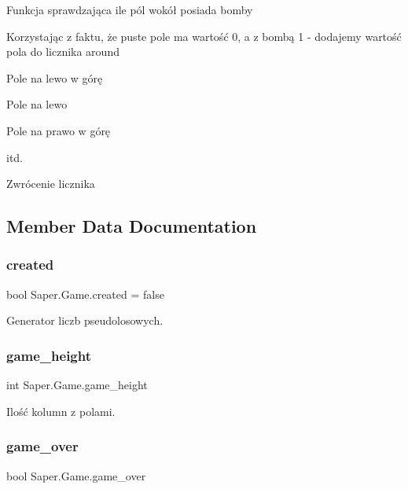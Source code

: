 Funkcja sprawdzająca ile pól wokół posiada bomby

Korzystając z faktu, że puste pole ma wartość 0, a z bombą 1 -\/ dodajemy wartość pola do licznika around

Pole na lewo w górę

Pole na lewo

Pole na prawo w górę

itd.

Zwrócenie licznika 

\subsection{Member Data Documentation}
\mbox{\label{class_saper_1_1_game_adc5efafe49ceab9315e68c8077db0800}} 
\subsubsection{\texorpdfstring{created}{created}}
{\footnotesize\ttfamily bool Saper.\+Game.\+created = false}



Generator liczb pseudolosowych. 

\mbox{\label{class_saper_1_1_game_a4384a168c23e724b445de95a6af206ff}} 
\subsubsection{\texorpdfstring{game\_height}{game\_height}}
{\footnotesize\ttfamily int Saper.\+Game.\+game\+\_\+height}



Ilość kolumn z polami. 

\mbox{\label{class_saper_1_1_game_a34bdb6551f2f859d65cd424b97c48d74}} 
\subsubsection{\texorpdfstring{game\_over}{game\_over}}
{\footnotesize\ttfamily bool Saper.\+Game.\+game\+\_\+over}



